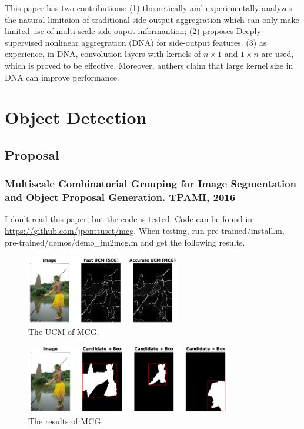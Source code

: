 \documentclass[10pt,onecolumn]{book}
\begin{document}
This paper has two contributions: 
(1) \uline{theoretically and experimentally} analyzes the natural limitaion of traditional side-output aggregration which can only make limited use of multi-scale side-ouput informantion; 
(2) proposes Deeply-supervised nonlinear aggregration (DNA) for side-output features. 
(3) as experience, in DNA, convolution layers with kernels of $n \times 1$ and $1 \times n$ are used, which is proved to be effective. Moreover, authers claim that large kernel size in DNA can improve performance.

\chapter{Object Detection}
\section{Proposal}
\subsection{Multiscale Combinatorial Grouping for Image Segmentation and Object Proposal Generation. TPAMI, 2016}
I don't read this paper, but the code is tested. Code can be found in \url{https://github.com/jponttuset/mcg}. When testing, run pre-trained/install.m, pre-trained/demos/demo\_im2mcg.m and get the following results.
\begin{figure}[h]
\centering
\includegraphics[width=0.6\textwidth]{figures_paper_reading/MCG_UCM.png}
\caption{The UCM of MCG.}
\label{fig}
\end{figure}

\begin{figure}[h]
\centering
\includegraphics[width=0.8\textwidth]{figures_paper_reading/MCG.png}
\caption{The results of MCG.}
\label{fig}
\end{figure}
\end{document}
